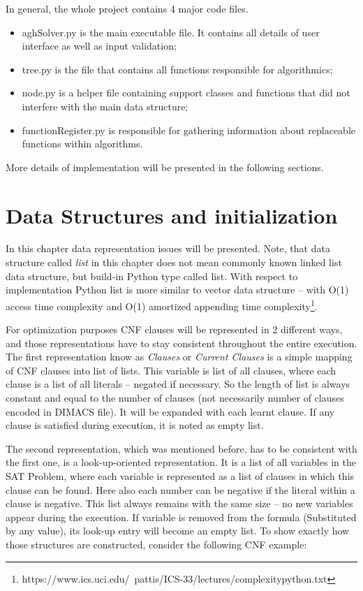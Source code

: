 \documentclass[12pt,english,pdflatex]{aghdpl}
\begin{document}
In general, the whole project contains 4 major code files.
\begin{itemize}
\item aghSolver.py is the main executable file. It contains all details of user interface as well as input validation; 
\item tree.py is the file that contains all functions responsible for algorithmics; 
\item node.py is a helper file containing support classes and functions that did not interfere with the main data structure;
\item functionRegister.py is responsible for gathering information about replaceable functions within algorithms.
\end{itemize}
More details of implementation will be presented in the following sections.

\section{Data Structures and initialization}
\label{sec:DataStrcuture}

In this chapter data representation issues will be presented. Note, that data
structure called \textit{list} in this chapter does not mean commonly
known linked list data structure, but build-in Python type called
list. With respect to implementation Python list  is more similar to vector
data structure -- with O(1) access time complexity and O(1) amortized
appending time complexity\footnote{https://www.ics.uci.edu/~pattis/ICS-33/lectures/complexitypython.txt}.

For optimization purposes CNF clauses will be represented in 2 different
ways, and those representations have to stay consistent throughout the
entire execution. The first representation know as \textit{Clauses} or \textit{Current
Clauses} is a simple mapping of CNF clauses into list of lists. This
variable is list of all clauses, where each clause is a list of all
literals -- negated if necessary. So the length of list is always constant
and equal to the number of clauses (not necessarily number of clauses
encoded in DIMACS file). It will be expanded with each learnt clause.
If any clause is satisfied during execution, it is noted as empty list.


The second representation, which was mentioned
before, has to be consistent with the first one, is a look-up-oriented representation.
It is a list of all variables in the SAT Problem, where each variable is
represented as a list of clauses in which this clause can be found.
Here also each number can be negative if the literal within a clause is
negative. This list always remains with the same size -- no new variables appear during the execution.
If variable is removed from the formula (Substituted by any value), its look-up entry will
become an empty list.
To show exactly how those structures are constructed, consider
the following CNF example\label{misc:datastructexample}:
\end{document}

